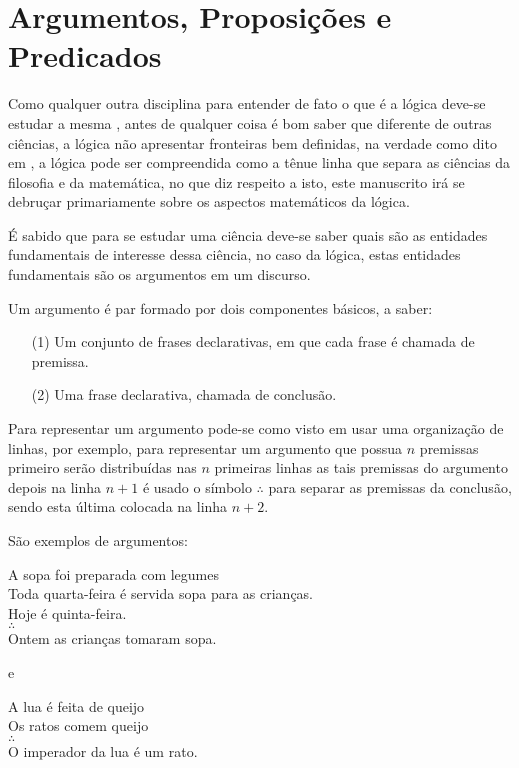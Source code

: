 \section{Argumentos, Proposições e Predicados}\label{sec:Argumento-Proposicao-Predicado}

Como qualquer outra disciplina para entender de fato o que é a lógica deve-se estudar a mesma \cite{copi1981}, antes de qualquer coisa é bom saber que diferente de outras ciências, a lógica não apresentar fronteiras bem definidas, na verdade como dito em \cite{joaoPavao2014}, a lógica pode ser compreendida como a tênue linha que separa as ciências da filosofia e da matemática, no que diz respeito a isto, este manuscrito irá se debruçar primariamente sobre os aspectos matemáticos da lógica.

É sabido que para se estudar uma ciência deve-se saber quais são as entidades fundamentais de interesse dessa ciência, no caso da lógica, estas entidades fundamentais são os argumentos em um discurso. 

\begin{definition}[Argumento]\label{def:Argumento}
	Um argumento é par formado por dois componentes básicos, a saber:
	\begin{itemize}
		\item[(1)] Um conjunto de frases declarativas, em que cada frase é chamada de premissa.
		\item[(2)] Uma frase declarativa, chamada de conclusão.
	\end{itemize}
\end{definition}

Para representar um argumento pode-se como visto em \cite{copi1981, joaoPavao2014} usar uma organização de linhas, por exemplo, para representar um argumento que possua $n$ premissas primeiro serão distribuídas nas $n$ primeiras linhas as tais premissas do argumento depois na linha $n+1$ é usado o símbolo $\wasytherefore$ para separar as premissas da conclusão, sendo esta última colocada na linha $n+2$.

\begin{exem}\label{exe:Argumento}
	São exemplos de argumentos:\\
		\begin{center}
			A sopa foi preparada  com legumes\\ 
			Toda quarta-feira é servida sopa para as crianças.\\
			Hoje é quinta-feira.\\
			$\wasytherefore$\\
			Ontem as crianças tomaram sopa.
		\end{center}
	
		e
		
		\begin{center}
			A lua é feita de queijo\\
			Os ratos comem queijo\\ 
			$\wasytherefore$\\
			O imperador da lua é um rato.
		\end{center}
\end{exem} 

